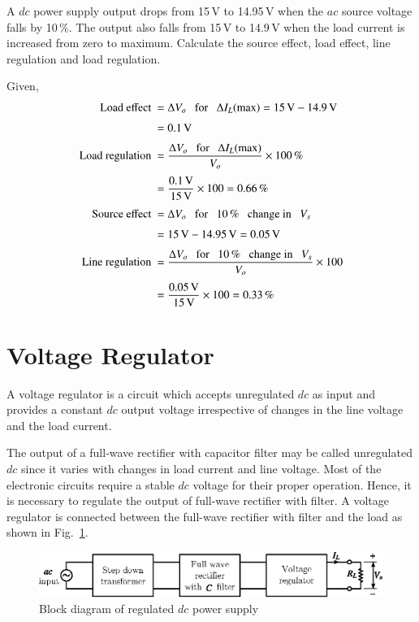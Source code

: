 \begin{example}\label{exam2.24}
A $dc$ power supply output drops from 15\,V to 14.95\,V when the $ac$ source voltage falls by 10\,\%. The output also falls from 15\,V to 14.9\,V when the load current is increased from zero to maximum. Calculate the source effect, load effect, line regulation and load regulation.
\end{example}

\begin{solution}
Given,
\begin{align*}
\text{Load effect } &= \Delta V_{o}\text{~~ for~~ }\Delta I_{L}(\max)
= 15\text{\,V}-14.9\text{\,V}\\[3pt]
&= 0.1\text{\,V}\\[3pt]
\text{Load regulation } &= \dfrac{\Delta V_{o}\text{~~ for~~ }\Delta I_{L}(\max)}{V_{o}}\times 100\,\%\\[3pt]
&= \frac{0.1\text{\,V}}{15\,\text{V}}\times 100
= 0.66\,\%\\[3pt]
\text{Source effect } &= \Delta V_{o}\text{~~ for~~ } 10\,\%\text{~~ change in~~ } V_{s}\\[3pt]
&= 15\text{\,V}-14.95\text{\,V}= 0.05\text{\,V}\\[3pt]
\text{Line regulation } &= \frac{\Delta V_{o}\text{~~ for~~ }10\,\%\text{~~ change in~~ } V_{s}}{V_{o}}\times 100\\[3pt]
&= \frac{0.05\text{\,V}}{15\text{\,V}}\times 100= 0.33\,\%
\end{align*}
\vskip -1cm
\end{solution}

\section{Voltage Regulator}\label{sec2.27}

A voltage regulator is a circuit which accepts unregulated $dc$ as input and provides a constant $dc$ output voltage irrespective of changes in the line voltage and the load current.

The output of a full-wave rectifier with capacitor filter may be called unregulated $dc$ since it varies with changes in load current and line voltage. Most of the electronic circuits require a stable $dc$ voltage for their proper operation. Hence, it is necessary to regulate the output of full-wave rectifier with filter. A voltage regulator is connected between the full-wave rectifier with filter and the load as shown in Fig.~\ref{fig2.22}.
\begin{figure}[H]
\centering
\includegraphics{chap2/fig2.22.eps}
\caption{Block diagram of regulated $dc$ power supply}\label{fig2.22}
\end{figure}

